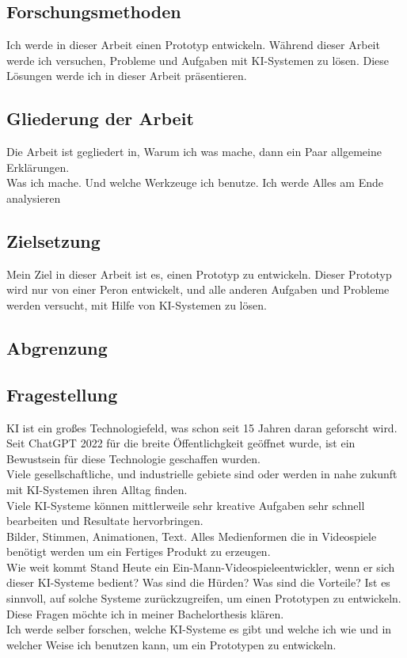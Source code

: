 \documentclass[12pt,a4paper,bibliography=totocnumbered,listof=totocnumbered]{scrartcl}
\begin{document}
\subsection{Forschungsmethoden}
Ich werde in dieser Arbeit einen Prototyp entwickeln. Während dieser Arbeit werde ich versuchen, Probleme und Aufgaben mit KI-Systemen zu lösen. Diese Lösungen werde ich in dieser Arbeit präsentieren.
\subsection{Gliederung der Arbeit}%
Die Arbeit ist gegliedert in, Warum ich was mache, dann ein Paar allgemeine Erklärungen.
\\
Was ich mache. Und welche Werkzeuge ich benutze. Ich werde Alles am Ende analysieren
\subsection{Zielsetzung}
Mein Ziel in dieser Arbeit ist es, einen Prototyp zu entwickeln. Dieser Prototyp wird nur von einer Peron entwickelt, und alle anderen Aufgaben und Probleme werden versucht, mit Hilfe von KI-Systemen zu lösen.
\subsection{Abgrenzung}
\subsection{Fragestellung}
KI ist ein großes Technologiefeld, was schon seit 15 Jahren daran geforscht wird. Seit ChatGPT 2022 für die breite Öffentlichgkeit geöffnet wurde, ist ein Bewustsein für diese Technologie geschaffen wurden.
\\
Viele gesellschaftliche, und industrielle gebiete sind oder werden in nahe zukunft mit KI-Systemen ihren Alltag finden.
\\
Viele KI-Systeme können mittlerweile sehr kreative Aufgaben sehr schnell bearbeiten und Resultate hervorbringen.
\\
Bilder, Stimmen, Animationen, Text. Alles Medienformen die in Videospiele benötigt werden um ein Fertiges Produkt zu erzeugen.
\\
Wie weit kommt Stand Heute ein Ein-Mann-Videospieleentwickler, wenn er sich dieser KI-Systeme bedient? Was sind die Hürden? Was sind die Vorteile? Ist es sinnvoll, auf solche Systeme zurückzugreifen, um einen Prototypen zu entwickeln.
\\
Diese Fragen möchte ich in meiner Bachelorthesis klären.
\\
Ich werde selber forschen, welche KI-Systeme es gibt und welche ich wie und in welcher Weise ich benutzen kann, um ein Prototypen zu entwickeln.
\end{document}
